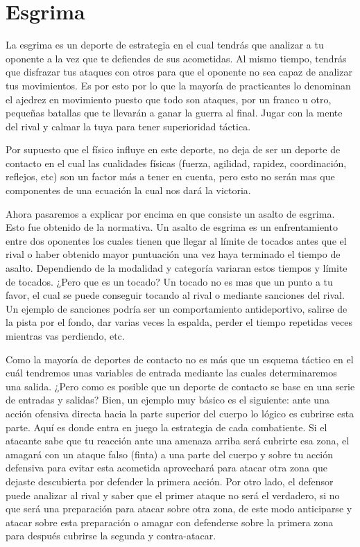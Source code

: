 \section{Esgrima}

La esgrima es un deporte de estrategia en el cual tendrás que analizar a tu
 oponente a la vez que te defiendes de sus acometidas. Al mismo tiempo, tendrás que
 disfrazar tus ataques con otros para que el oponente no sea capaz de analizar
 tus movimientos. Es por esto por lo que la mayoría de practicantes lo denominan
 el ajedrez en movimiento puesto que todo son ataques, por un franco u otro,
 pequeñas batallas que te llevarán a ganar la guerra al final. Jugar con la mente
 del rival y calmar la tuya para tener superioridad táctica.

Por supuesto que el físico influye en este deporte, no deja de ser un deporte de contacto
 en el cual las cualidades físicas (fuerza, agilidad, rapidez, coordinación, reflejos, etc)
 son un factor más a tener en cuenta, pero esto no serán mas que componentes de una ecuación
 la cual nos dará la victoria.

Ahora pasaremos a explicar por encima en que consiste un asalto de esgrima. Esto fue obtenido de la normativa\cite{normativaFIETec}.
 Un asalto de esgrima es un enfrentamiento entre dos
 oponentes los cuales tienen que llegar al límite de tocados antes que el rival o haber obtenido mayor puntuación
 una vez haya terminado el tiempo de asalto. Dependiendo de la modalidad y categoría
 variaran estos tiempos y límite de tocados. ¿Pero que es un tocado? Un tocado no es mas que
 un punto a tu favor, el cual se puede conseguir tocando al rival o mediante sanciones del rival.
 Un ejemplo de sanciones podría ser un comportamiento antideportivo, salirse de la pista por el fondo,
 dar varias veces la espalda, perder el tiempo repetidas veces mientras vas perdiendo, etc.

Como la mayoría de deportes de contacto no es más que un esquema táctico en el cuál tendremos unas variables
 de entrada mediante las cuales determinaremos una salida. ¿Pero como es posible que un deporte de contacto
 se base en una serie de entradas y salidas? Bien, un ejemplo muy básico es el siguiente: ante una acción ofensiva
 directa hacia la parte superior del cuerpo lo lógico es cubrirse esta parte. Aquí es donde entra en juego
 la estrategia de cada combatiente. Si el atacante sabe que tu reacción ante una amenaza arriba
 será cubrirte esa zona, el amagará con un ataque falso (finta) a una parte del cuerpo y sobre tu acción
 defensiva para evitar esta acometida aprovechará para atacar otra zona que dejaste descubierta por
 defender la primera acción. Por otro lado, el defensor puede analizar al rival y saber que el primer ataque
 no será el verdadero, si no que será una preparación para atacar sobre otra zona, de este modo anticiparse
 y atacar sobre esta preparación o amagar con defenderse sobre la primera zona para después cubrirse la segunda
 y contra-atacar.


